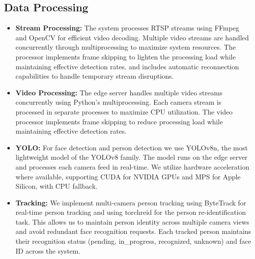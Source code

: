 \documentclass[conference]{IEEEtran}
\begin{document}
\subsection{Data Processing}
\begin{itemize}
      \item \textbf{Stream Processing:} The system processes RTSP streams using FFmpeg and OpenCV for efficient video decoding.
            Multiple video streams are handled concurrently through multiprocessing to maximize system resources.
            The processor implements frame skipping to lighten the processing load while maintaining effective detection rates.
            and includes automatic reconnection capabilities to handle temporary stream disruptions.
      \item \textbf{Video Processing:} The edge server handles multiple video streams concurrently using Python's multiprocessing.
            Each camera stream is processed in separate processes to maximize CPU utilization. The video processor implements frame skipping
            to reduce processing load while maintaining effective detection rates.
      \item \textbf{YOLO:} For face detection and person detection we use YOLOv8n, the most lightweight model of the YOLOv8 family.
            The model runs on the edge server and processes each camera feed in real-time. We utilize hardware acceleration where available,
            supporting CUDA for NVIDIA GPUs and MPS for Apple Silicon, with CPU fallback.
      \item \textbf{Tracking:} We implement multi-camera person tracking using ByteTrack for real-time person tracking and using torchreid for the person re-identification task.
            This allows us to maintain person identity across multiple camera views and avoid redundant face recognition requests.
            Each tracked person maintains their recognition status (pending, in\_progress, recognized, unknown) and face ID across the system.
\end{itemize}
\end{document}
